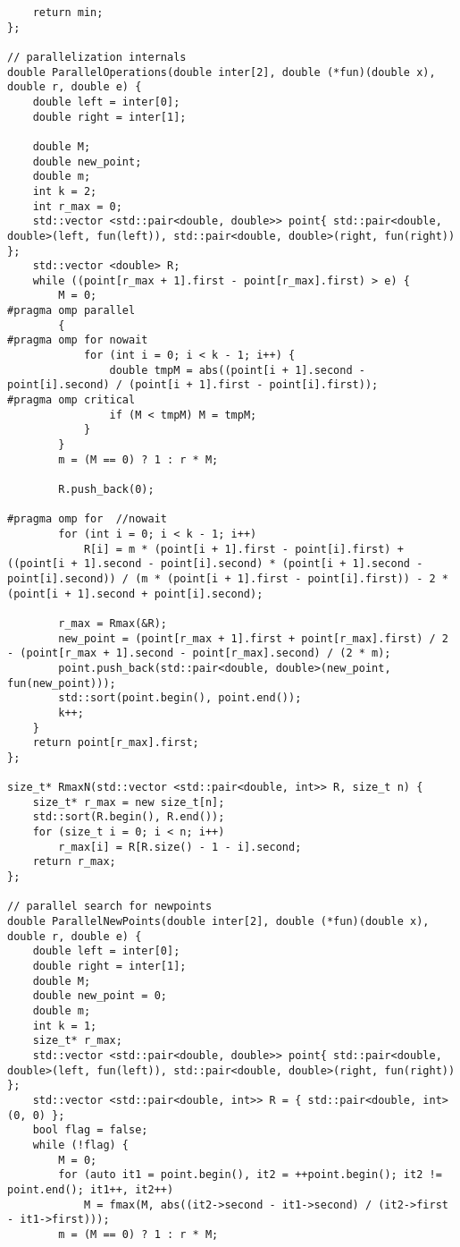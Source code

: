 \documentclass{report}
\begin{document}
\begin{lstlisting}
    return min;
};

// parallelization internals
double ParallelOperations(double inter[2], double (*fun)(double x), double r, double e) {
    double left = inter[0];
    double right = inter[1];

    double M;
    double new_point;
    double m;
    int k = 2;
    int r_max = 0;
    std::vector <std::pair<double, double>> point{ std::pair<double, double>(left, fun(left)), std::pair<double, double>(right, fun(right)) };
    std::vector <double> R;
    while ((point[r_max + 1].first - point[r_max].first) > e) {
        M = 0;
#pragma omp parallel
        {
#pragma omp for nowait
            for (int i = 0; i < k - 1; i++) {
                double tmpM = abs((point[i + 1].second - point[i].second) / (point[i + 1].first - point[i].first));
#pragma omp critical
                if (M < tmpM) M = tmpM;
            }
        }
        m = (M == 0) ? 1 : r * M;

        R.push_back(0);

#pragma omp for  //nowait
        for (int i = 0; i < k - 1; i++)
            R[i] = m * (point[i + 1].first - point[i].first) + ((point[i + 1].second - point[i].second) * (point[i + 1].second - point[i].second)) / (m * (point[i + 1].first - point[i].first)) - 2 * (point[i + 1].second + point[i].second);

        r_max = Rmax(&R);
        new_point = (point[r_max + 1].first + point[r_max].first) / 2 - (point[r_max + 1].second - point[r_max].second) / (2 * m);
        point.push_back(std::pair<double, double>(new_point, fun(new_point)));
        std::sort(point.begin(), point.end());
        k++;
    }
    return point[r_max].first;
};

size_t* RmaxN(std::vector <std::pair<double, int>> R, size_t n) {
    size_t* r_max = new size_t[n];
    std::sort(R.begin(), R.end());
    for (size_t i = 0; i < n; i++)
        r_max[i] = R[R.size() - 1 - i].second;
    return r_max;
};

// parallel search for newpoints
double ParallelNewPoints(double inter[2], double (*fun)(double x), double r, double e) {
    double left = inter[0];
    double right = inter[1];
    double M;
    double new_point = 0;
    double m;
    int k = 1;
    size_t* r_max;
    std::vector <std::pair<double, double>> point{ std::pair<double, double>(left, fun(left)), std::pair<double, double>(right, fun(right)) };
    std::vector <std::pair<double, int>> R = { std::pair<double, int>(0, 0) };
    bool flag = false;
    while (!flag) {
        M = 0;
        for (auto it1 = point.begin(), it2 = ++point.begin(); it2 != point.end(); it1++, it2++)
            M = fmax(M, abs((it2->second - it1->second) / (it2->first - it1->first)));
        m = (M == 0) ? 1 : r * M;


\end{lstlisting}
\end{document}
